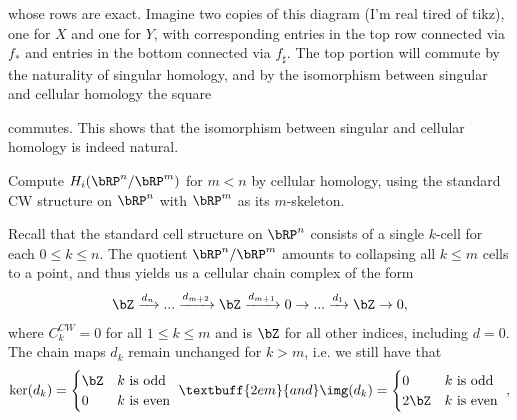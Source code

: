 \begin{homework}[e]
\begin{prf}
\begin{center}
  \end{center}
  whose rows are exact. Imagine two copies of this diagram (I'm real tired of tikz), one for $X$ and one for $Y$, with corresponding entries in the top row connected via $f_*$ and entries in the bottom connected via $f_\sharp$. The top portion will commute by the naturality of singular homology, and by the isomorphism between singular and cellular homology the square
  \begin{center}
  \end{center}
  commutes. This shows that the isomorphism between singular and cellular homology is indeed natural.
  \end{prf}
   Compute $H_i(\bRP^n/\bRP^m)$ for $m < n$ by cellular homology, using the standard CW structure on $\bRP^n$ with $\bRP^m$ as its $m$-skeleton.
  \begin{prf}
    Recall that the standard cell structure on $\bRP^n$ consists of a single $k$-cell for each $0\leq k\leq n$. The quotient $\bRP^n/\bRP^m$ amounts to collapsing all $k \leq m$ cells to a point, and thus yields us a cellular chain complex of the form
    \begin{align*}
      \bZ \xrightarrow{d_n} ... \xrightarrow{d_{m+2}} \bZ \xrightarrow{d_{m+1}} 0 \to ... \xrightarrow{d_1} \bZ \to 0,
    \end{align*}
    where $C^{CW}_k = 0$ for all $1 \leq k \leq m$ and is $\bZ$ for all other indices, including $d = 0$. The chain maps $d_k$ remain unchanged for $k > m$, i.e. we still have that
    \begin{align*}
      \ker(d_k) =
      \begin{cases}
        \bZ & k \text{ is odd } \\
        0 & k \text{ is even }
      \end{cases}
      \textbuff{2em}{and}
      \img(d_k) =
      \begin{cases}
        0 & k \text{ is odd } \\
        2\bZ & k \text{ is even }
      \end{cases},
    \end{align*}

\end{prf}
\end{homework}
